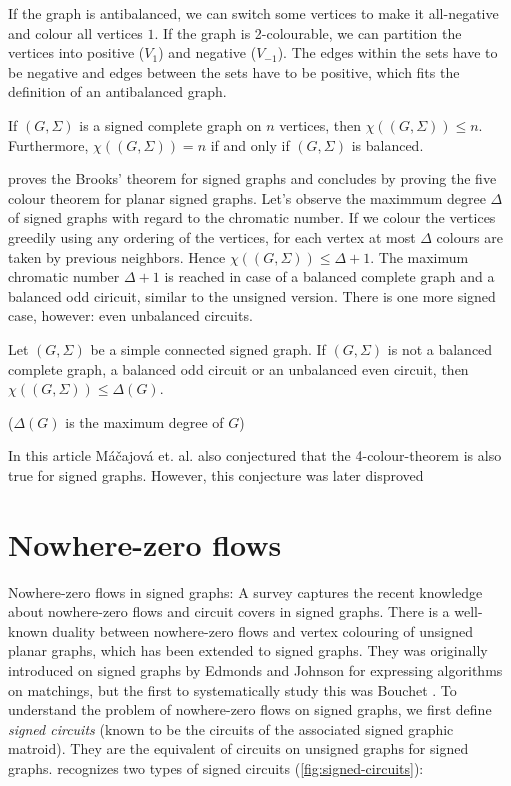 If the graph is antibalanced, we can switch some vertices to make it all-negative and colour all vertices $1$.
If the graph is 2-colourable, we can partition the vertices into positive ($V_1$) and negative ($V_{-1}$).
The edges within the sets have to be negative and edges between the sets have to be positive, which fits the definition of an antibalanced graph.

\begin{proposition}[Máčajová et. al.]
    If $(G, \Sigma)$ is a signed complete graph on $n$ vertices, then $\chi ((G, \Sigma)) \leq n$.
    Furthermore, $\chi ((G, \Sigma)) = n$ if and only if $(G, \Sigma)$ is balanced.
\end{proposition}

\cite{chromatic-number} proves the Brooks' theorem\cite{brooks} for signed graphs and concludes by proving the five colour theorem for planar signed graphs.
Let's observe the maximmum degree $\Delta$ of signed graphs with regard to the chromatic number.
If we colour the vertices greedily using any ordering of the vertices, for each vertex at most
$\Delta$ colours are taken by previous neighbors. Hence $\chi ((G, \Sigma)) \leq \Delta + 1$.
The maximum chromatic number $\Delta + 1$ is reached in case of a balanced complete graph and
a balanced odd ciricuit, similar to the unsigned version. There is one more signed case, however: even unbalanced circuits.

\begin{theorem}[Máčajová et. al.]
    Let $(G, \Sigma)$ be a simple connected signed graph. If $(G, \Sigma)$ is not a balanced complete graph,
    a balanced odd circuit or an unbalanced even circuit, then $\chi ((G, \Sigma)) \leq \Delta (G)$.
\end{theorem}

($\Delta (G)$ is the maximum degree of $G$)

In this article Máčajová et. al. also conjectured that the 4-colour-theorem is also true for signed graphs. However, this conjecture
was later disproved\cite{signed-4-colour-conjecture}

\section{Nowhere-zero flows}

Nowhere-zero flows in signed graphs: A survey\cite{nowhere-zero-flows-survey} captures the recent knowledge about nowhere-zero flows and circuit covers in signed graphs.
There is a well-known duality between nowhere-zero flows and vertex colouring of unsigned planar graphs, which has been extended to signed graphs.
They was originally introduced on signed graphs by Edmonds and Johnson\cite{edmonds-johnson} for expressing algorithms on matchings, but the first to systematically study this was Bouchet \cite{bouchet-flows}.
To understand
the problem of nowhere-zero flows on signed graphs, we first define \textit{signed circuits} (known to be the circuits of the associated signed graphic matroid).
They are the equivalent of circuits on unsigned graphs for signed graphs. \cite{nowhere-zero-flows-survey} recognizes two types of signed circuits (\cref{fig:signed-circuits}):

